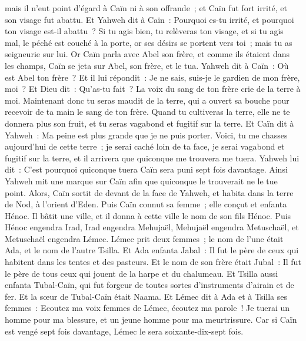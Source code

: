 \begin{multicols}{2}
mais il n'eut point d'égard à Caïn ni à son offrande~; et Caïn fut fort irrité, et son visage fut abattu.
Et Yahweh dit à Caïn~: Pourquoi es-tu irrité, et pourquoi ton visage est-il abattu~?
Si tu agis bien, tu relèveras ton visage, et si tu agis mal, le péché est couché à la porte, or ses désirs se portent vers toi~; mais tu as seigneurie sur lui.
Or Caïn parla avec Abel son frère, et comme ils étaient dans les champs, Caïn se jeta sur Abel, son frère, et le tua.
Yahweh dit à Caïn~: Où est Abel ton frère~? Et il lui répondit~: Je ne sais, suis-je le gardien de mon frère, moi~?
Et Dieu dit~: Qu'as-tu fait~? La voix du sang de ton frère crie de la terre à moi.
Maintenant donc tu seras maudit de la terre, qui a ouvert sa bouche pour recevoir de ta main le sang de ton frère.
Quand tu cultiveras la terre, elle ne te donnera plus son fruit, et tu seras vagabond et fugitif sur la terre.
Et Caïn dit à Yahweh~: Ma peine est plus grande que je ne puis porter.
Voici, tu me chasses aujourd'hui de cette terre~; je serai caché loin de ta face, je serai vagabond et fugitif sur la terre, et il arrivera que quiconque me trouvera me tuera.
Yahweh lui dit~: C'est pourquoi quiconque tuera Caïn sera puni sept fois davantage. Ainsi Yahweh mit une marque sur Caïn afin que quiconque le trouverait ne le tue point.
Alors, Caïn sortit de devant de la face de Yahweh, et habita dans la terre de Nod, à l'orient d'Eden.
Puis Caïn connut sa femme~; elle conçut et enfanta Hénoc. Il bâtit une ville, et il donna à cette ville le nom de son fils Hénoc.
Puis Hénoc engendra Irad, Irad engendra Mehujaël, Mehujaël engendra Metuschaël, et Metuschaël engendra Lémec.
Lémec prit deux femmes~; le nom de l'une était Ada, et le nom de l'autre Tsilla.
Et Ada enfanta Jabal~: Il fut le père de ceux qui habitent dans les tentes et des pasteurs.
Et le nom de son frère était Jubal~: Il fut le père de tous ceux qui jouent de la harpe et du chalumeau.
Et Tsilla aussi enfanta Tubal-Caïn, qui fut forgeur de toutes sortes d'instruments d'airain et de fer. Et la sœur de Tubal-Caïn était Naama.
Et Lémec dit à Ada et à Tsilla ses femmes~: Ecoutez ma voix femmes de Lémec, écoutez ma parole~! Je tuerai un homme pour ma blessure, et un jeune homme pour ma meurtrissure.
Car si Caïn est vengé sept fois davantage, Lémec le sera soixante-dix-sept fois.

\end{multicols}
